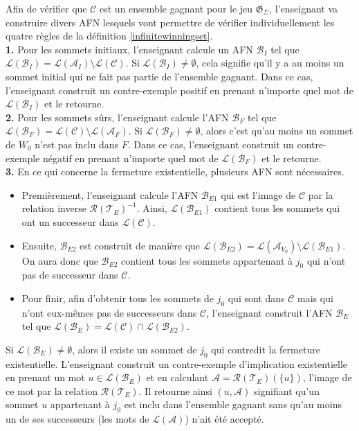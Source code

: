 \documentclass[12pt,a4paper,oneside,titlepage]{report}
\begin{document}
Afin de vérifier que $\mathcal{C}$ est un ensemble gagnant pour le jeu $\mathfrak{G}_\Sigma$, l'enseignant va construire divers AFN lesquels vont permettre de vérifier individuellement les quatre règles de la définition \ref{infinitewinningset}.\\
\newpage
\noindent \textbf{1.} Pour les sommets initiaux, l'enseignant calcule un AFN $\mathcal{B}_I$ tel que $\mathcal{L}(\mathcal{B}_I)=\mathcal{L}(\mathcal{A}_I)\setminus\mathcal{L}(\mathcal{C})$. Si $\mathcal{L}(\mathcal{B}_I)\neq\emptyset$, cela signifie qu'il y a au moins un sommet initial qui ne fait pas partie de l'ensemble gagnant. Dans ce cas, l'enseignant construit un contre-exemple positif en prenant n'importe quel mot de $\mathcal{L}(\mathcal{B}_I)$ et le retourne.\\

\noindent\textbf{2.} Pour les sommets sûrs, l'enseignant calcule l'AFN $\mathcal{B}_F$ tel que $\mathcal{L}(\mathcal{B}_F)=\mathcal{L}(\mathcal{C})\setminus\mathcal{L}(\mathcal{A}_F)$. Si $\mathcal{L}(\mathcal{B}_F)\neq\emptyset$, alors c'est qu'au moins un sommet de $W_0$ n'est pas inclu dans $F$. Dans ce cas, l'enseignant construit un contre-exemple négatif en prenant n'importe quel mot de $\mathcal{L}(\mathcal{B}_F)$ et le retourne.\\

\noindent\textbf{3.} En ce qui concerne la fermeture existentielle, plusieurs AFN sont nécessaires. 
\begin{itemize}
\item Premièrement, l'enseignant calcule l'AFN $\mathcal{B}_{E1}$ qui est l'image de $\mathcal{C}$ par la relation inverse $\mathcal{R}(\mathcal{T}_E)^{-1}$. Ainsi, $\mathcal{L}(\mathcal{B}_{E1})$ contient tous les sommets qui ont un successeur dans $\mathcal{L}(\mathcal{C})$. \item Ensuite, $\mathcal{B}_{E2}$ est construit de manière que $\mathcal{L}(\mathcal{B}_{E2})=\mathcal{L}(\mathcal{A}_{V_0})\setminus\mathcal{L}(\mathcal{B}_{E1})$. On aura donc que $\mathcal{B}_{E2}$ contient tous les sommets appartenant à $j_0$ qui n'ont pas de successeur dans $\mathcal{C}$. 
\item Pour finir, afin d'obtenir tous les sommets de $j_0$ qui sont dans $\mathcal{C}$ mais qui n'ont eux-mêmes pas de successeurs dans $\mathcal{C}$, l'enseignant construit l'AFN $\mathcal{B}_E$ tel que $\mathcal{L}(\mathcal{B}_E)=\mathcal{L}(\mathcal{C})\cap\mathcal{L}(\mathcal{B}_{E2})$. 
\end{itemize}
Si $\mathcal{L}(\mathcal{B}_E)\neq\emptyset$, alors il existe un sommet de $j_0$ qui contredit la fermeture existentielle. L'enseignant construit un contre-exemple d'implication existentielle en prenant un mot $u\in\mathcal{L}(\mathcal{B}_E)$ et en calculant $\mathcal{A}=\mathcal{R}(\mathcal{T}_E)(\{u\})$, l'image de ce mot par la relation $\mathcal{R}(\mathcal{T}_E)$. Il retourne ainsi $(u,\mathcal{A})$ signifiant qu'un sommet $u$ appartenant à $j_0$ est inclu dans l'ensemble gagnant sans qu'au moins un de ses successeurs (les mots de $\mathcal{L}(\mathcal{A})$) n'ait été accepté.\\
\end{document}
